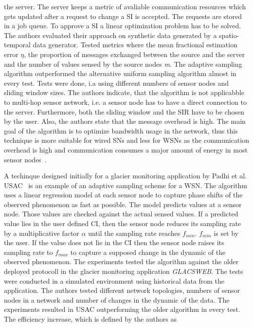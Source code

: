 the server. The server keeps a metric of avaliable communication resources
which gets updated after a request to change a \ac{SI} is accepted. The
requests are stored in a job queue. To approve a \ac{SI} a linear optimization
problem has to be solved. The authors evaluated their approach on synthetic
data generated by a spatio-temporal data generator. Tested metrics where the
mean fractional estimation error $ \eta $, the proportion of messages exchanged
between the source and the server and the number of values sensed by the source
nodes \textit{m}. The adaptive sampling algorithm outperformed the alternative
uniform sampling algorithm almost in every test. Tests were done, i.a using
different numbers of sensor nodes and sliding window sizes. The authors
indicate, that the algorithm is not applicabble to multi-hop sensor network,
i.e. a sensor node has to have a direct connection to the server. Furthermore,
both the sliding window and the \ac{SIR} have to be chosen by the user. Also,
the authors state that the message overhead is high. The main goal of the
algorithm is to optimize bandwidth usage in the network, thus this technique is
more suitable for wired \acp{SN} and less for \acp{WSN} as the communication
overhead is high and communication consumes a major amount of energy in
most sensor nodes~\cite{raghunathan2002energy}.
\par
A techinque designed initially for a glacier monitoring application by Padhi et
al. \ac{USAC}~\cite{padhy2006utility} is an example of an adaptive sampling
scheme for a \ac{WSN}. The algorithm uses a linear regression model at each
sensor node to capture phase shifts of the observed phenomenon as fast as
possible. The model predicts values at a sensor node. Those values are checked
against the actual sensed values. If a predicted value lies in the user defined
\ac{CI}, then the sensor node reduces its sampling rate by a multiplicative
factor $ \alpha $ until the sampling rate reaches $ f_{min} $. $ f_{min} $ is
set by the user. If the value does not lie in the \ac{CI} then the sensor node
raises its sampling rate to $ f_{max} $ to capture a supposed change in the
dynamic of the observed phenomenon. The experiments tested the algorithm
against the older deployed protocoll in the glacier monitoring application
\textit{GLACSWEB}. The tests were conducted in a simulated environment using
historical data from the application. The authors tested different network
topologies, numbers of sensor nodes in a network and number of changes in the
dynamic of the data. The experiments resulted in \ac{USAC} outperforming the
older algorithm in every test. The efficiency increase, which is defined by the
authors as

